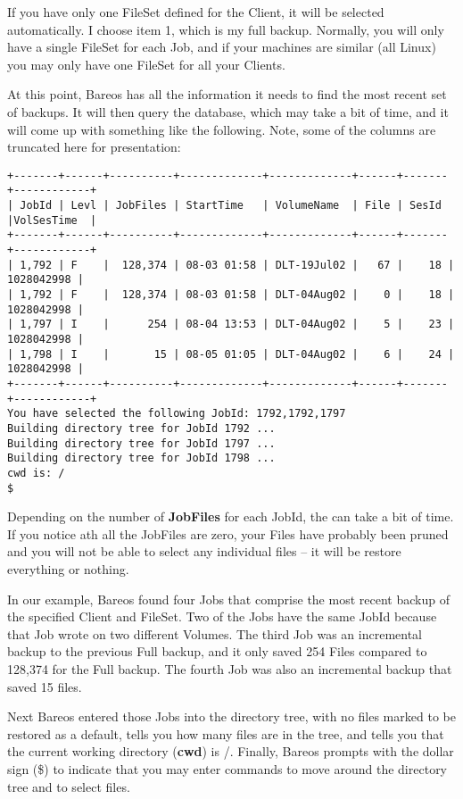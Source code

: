 If you have only one FileSet defined for the Client, it will be selected
automatically.  I choose item 1, which is my full backup.  Normally, you
will only have a single FileSet for each Job, and if your machines are
similar (all Linux) you may only have one FileSet for all your Clients.

At this point, Bareos has all the information it needs to find the most
recent set of backups. It will then query the database, which may take a bit
of time, and it will come up with something like the following. Note, some of
the columns are truncated here for presentation:

\footnotesize
\begin{verbatim}
+-------+------+----------+-------------+-------------+------+-------+------------+
| JobId | Levl | JobFiles | StartTime   | VolumeName  | File | SesId |VolSesTime  |
+-------+------+----------+-------------+-------------+------+-------+------------+
| 1,792 | F    |  128,374 | 08-03 01:58 | DLT-19Jul02 |   67 |    18 | 1028042998 |
| 1,792 | F    |  128,374 | 08-03 01:58 | DLT-04Aug02 |    0 |    18 | 1028042998 |
| 1,797 | I    |      254 | 08-04 13:53 | DLT-04Aug02 |    5 |    23 | 1028042998 |
| 1,798 | I    |       15 | 08-05 01:05 | DLT-04Aug02 |    6 |    24 | 1028042998 |
+-------+------+----------+-------------+-------------+------+-------+------------+
You have selected the following JobId: 1792,1792,1797
Building directory tree for JobId 1792 ...
Building directory tree for JobId 1797 ...
Building directory tree for JobId 1798 ...
cwd is: /
$
\end{verbatim}
\normalsize

Depending on the number of {\bf JobFiles} for each JobId,
the  can take a bit of time.
If you notice ath all the
JobFiles are zero, your Files have probably been pruned and you will not be
able to select any individual files -- it will be restore everything or
nothing.

In our example, Bareos found four Jobs that comprise the most recent backup of
the specified Client and FileSet. Two of the Jobs have the same JobId because
that Job wrote on two different Volumes. The third Job was an incremental
backup to the previous Full backup, and it only saved 254 Files compared to
128,374 for the Full backup. The fourth Job was also an incremental backup
that saved 15 files.

Next Bareos entered those Jobs into the directory tree, with no files marked
to be restored as a default, tells you how many files are in the tree, and
tells you that the current working directory ({\bf cwd}) is /. Finally, Bareos
prompts with the dollar sign (\$) to indicate that you may enter commands to
move around the directory tree and to select files.

